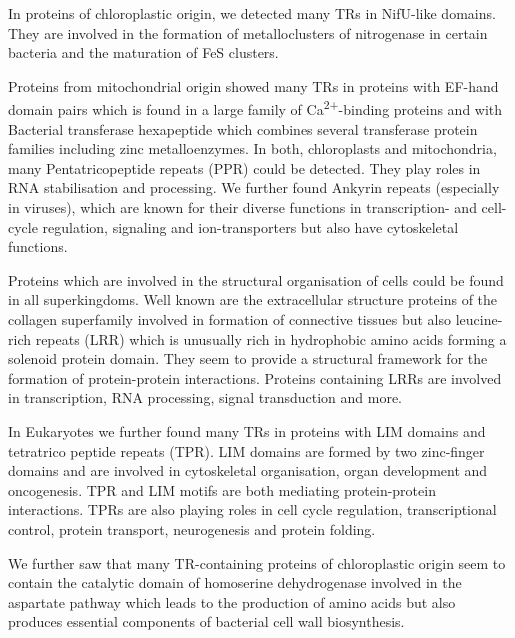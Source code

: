 \documentclass[a4,center,fleqn]{NAR}
\begin{document}
In proteins of chloroplastic origin, we detected many TRs in NifU-like domains.
They are involved in the formation of metalloclusters of nitrogenase in certain bacteria and the maturation of FeS clusters. 

Proteins from mitochondrial origin showed many TRs in proteins with EF-hand domain pairs which is found in a large family of Ca\textsuperscript{2+}-binding proteins and with Bacterial transferase hexapeptide which combines several transferase protein families including zinc metalloenzymes.
In both, chloroplasts and mitochondria, many Pentatricopeptide repeats (PPR) could be detected. They play roles in RNA stabilisation and processing.
We further found Ankyrin repeats (especially in viruses), which are known for their diverse functions in transcription- and cell-cycle regulation, signaling and ion-transporters but also have cytoskeletal functions.

Proteins which are involved in the structural organisation of cells could be found in all superkingdoms. Well known are the extracellular structure proteins of the collagen superfamily involved in formation of connective tissues but also leucine-rich repeats (LRR) which is unusually rich in hydrophobic amino acids forming a solenoid protein domain. They seem to provide a structural framework for the formation of protein-protein interactions.
Proteins containing LRRs are involved in transcription, RNA processing, signal transduction and more.

In Eukaryotes we further found many TRs in proteins with LIM domains and tetratrico peptide repeats (TPR). LIM domains are formed by two zinc-finger domains and are involved in cytoskeletal organisation, organ development and oncogenesis. TPR and LIM motifs are both mediating protein-protein interactions. TPRs are also playing roles in cell cycle regulation, transcriptional control, protein transport, neurogenesis and protein folding.

We further saw that many TR-containing proteins of chloroplastic origin seem to contain the catalytic domain of homoserine dehydrogenase involved in the aspartate pathway which leads to the production of amino acids but also produces essential components of bacterial cell wall biosynthesis.
\end{document}
